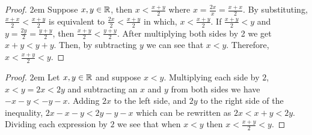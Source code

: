 \begin{mdframed}[backgroundcolor=gray!10!]
\begin{mdframed}[backgroundcolor=white]
\begin{proof}  \openup 2em Suppose $x,y \in \mathbb{R}$, then $x<\frac{x+y}{2}$ where $x=\frac{2x}{x} = \frac{x+x}{2}$.  By substituting, $\frac{x+x}{2}<\frac{x+y}{2}$ is equivalent to $\frac{2x}{2}<\frac{x+y}{2}$ in which, $x< \frac{x+y}{2}.$  If $\frac{x+y}{2}<y$ and $y = \frac{2y}{2}=\frac{y+y}{2}$, then $\frac{x+y}{2}<\frac{y+y}{2}$.  After multiplying both sides by 2 we get $x+y<y+y$.  Then, by subtracting $y$ we can see that $x<y$.  Therefore, $x<\frac{x+y}{2}<y$.
\end{proof}
\end{mdframed}

\begin{mdframed}[backgroundcolor=white]
\begin{proof} \openup 2em
Let $x,y\in \mathbb{R}$ and suppose $x<y$.  Multiplying each side by $2$, $x<y = 2x<2y$ and subtracting an $x$ and $y$ from both sides we have $-x-y<-y-x$.  Adding $2x$ to the left side, and $2y$ to the right side of the inequality, $2x-x-y<2y-y-x$ which can be rewritten as $2x<x+y<2y$.  Dividing each expression by $2$ we see that when $x<y$ then $x< \frac{x+y}{2} < y$.
\end{proof}
\end{mdframed}
\end{mdframed}

\medskip

